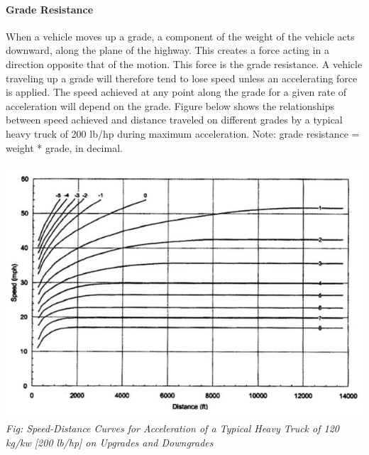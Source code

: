 \paragraph{Grade Resistance}
When a vehicle moves up a grade, a component of the weight of the vehicle acts downward, along the plane of the highway. This creates a force acting in a direction opposite that of the motion. This force is the grade resistance. A vehicle traveling up a grade will therefore tend to lose speed unless an accelerating force is applied. The speed achieved at any point along the grade for a given rate of acceleration will depend on the grade. Figure below shows the relationships between speed achieved and distance traveled on different grades by a typical heavy truck of 200 lb/hp during maximum acceleration. Note: grade resistance = weight * grade, in decimal.\\\\
\includegraphics{gfx/fig8.png}
\emph{Fig: Speed-Distance Curves for Acceleration of a Typical Heavy Truck of 120 kg/kw [200 lb/hp] on Upgrades and Downgrades}
